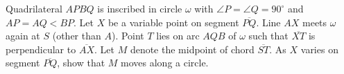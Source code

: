 Quadrilateral $APBQ$ is inscribed in circle $\omega$ with $\angle P = \angle Q = 90^{\circ}$ and $AP = AQ < BP$. Let $X$ be a variable point on segment $\overline{PQ}$. Line $AX$ meets $\omega$ again at $S$ (other than $A$). Point $T$ lies on arc $AQB$ of $\omega$ such that $\overline{XT}$ is perpendicular to $\overline{AX}$. Let $M$ denote the midpoint of chord $\overline{ST}$. As $X$ varies on segment $\overline{PQ}$,  show that $M$ moves along a circle.